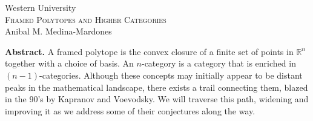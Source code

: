 \documentclass{article}
\begin{document}
	\pagestyle{empty}
	\begin{center}
		\large Western University \\
		\vspace*{5pt}
		\Large\textsc{Framed Polytopes and Higher Categories} \\
		\vspace*{10pt}
		\normalsize Anibal M. Medina-Mardones \\
	\end{center}
	\textbf{Abstract.}
	A framed polytope is the convex closure of a finite set of points in $\mathbb{R}^n$ together with a choice of basis.
	An $n$-category is a category that is enriched in $(n-1)$-categories. Although these concepts may initially appear to be distant peaks in the mathematical landscape, there exists a trail connecting them, blazed in the 90's by Kapranov and Voevodsky. We will traverse this path, widening and improving it as we address some of their conjectures along the way.
\end{document}
